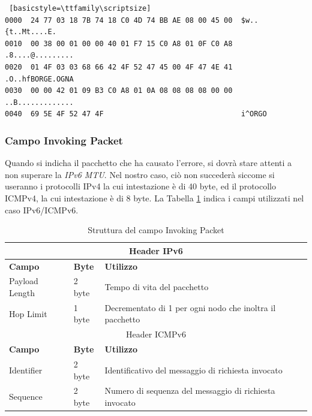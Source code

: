 \begin{center}
\begin{minipage}{0.9\linewidth}
\centering
\begin{lstlisting} [basicstyle=\ttfamily\scriptsize]
0000  24 77 03 18 7B 74 18 C0 4D 74 BB AE 08 00 45 00  $w..{t..Mt....E.
0010  00 38 00 01 00 00 40 01 F7 15 C0 A8 01 0F C0 A8  .8....@.........
0020  01 4F 03 03 68 66 42 4F 52 47 45 00 4F 47 4E 41  .O..hfBORGE.OGNA
0030  00 00 42 01 09 B3 C0 A8 01 0A 08 08 08 08 00 00  ..B.............
0040  69 5E 4F 52 47 4F                                i^ORGO
\end{lstlisting}
\label{code:covertStorage:header64bit} 
\end{minipage}
\end{center}

\subsubsection{Campo \textbf{Invoking Packet}} 
Quando si indicha il pacchetto che ha causato l'errore, si dovrà stare 
attenti a non superare la \textit{IPv6 MTU}. 
Nel nostro caso, ciò non succederà siccome si useranno i protocolli IPv4 la 
cui intestazione è di 40 byte, ed il protocollo ICMPv4, la cui intestazione 
è di 8 byte. 
La Tabella \ref{table:icmpv6:invokinppacket} indica i campi utilizzati nel caso IPv6/ICMPv6. 
\newline
\begin{longtable}{|p{}|p{}|p{}|} 
\caption{Struttura del campo Invoking Packet} 
\label{table:icmpv6:invokinppacket} \\
    \multicolumn{3}{c}{Header IPv6} \\ 
    \hline 
    \textbf{Campo} & \textbf{Byte} & \textbf{Utilizzo} \\
    \hline 
    Payload Length & 2 byte & Tempo di vita del pacchetto\\  
    \hline 
    Hop Limit & 1 byte & Decrementato di 1 per ogni nodo che inoltra il pacchetto\\  
    \hline 
    \multicolumn{3}{c}{Header ICMPv6} \\
    \hline
    \textbf{Campo} & \textbf{Byte} & \textbf{Utilizzo} \\
    \hline
    Identifier & 2 byte & Identificativo del messaggio di richiesta invocato\\  
    \hline 
    Sequence & 2 byte & Numero di sequenza del messaggio di richiesta invocato \\  
    \hline 
\end{longtable}


